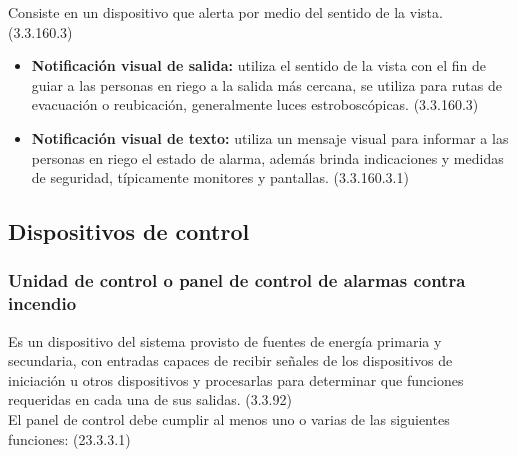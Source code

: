 Consiste en un dispositivo que alerta por medio del sentido de la vista. (3.3.160.3)


\begin{itemize}
	
	\item \textbf{Notificación visual de salida:} utiliza el sentido de la vista con el fin de guiar a las personas en riego a la salida más cercana, se utiliza para rutas de evacuación o reubicación, generalmente luces estroboscópicas. (3.3.160.3)
	
	\item \textbf{Notificación visual de texto:} utiliza un mensaje visual para informar a las personas en riego el estado de alarma, además brinda indicaciones y medidas de seguridad, típicamente monitores y pantallas. (3.3.160.3.1)
	
\end{itemize}



\subsection{Dispositivos de control}


\subsubsection{Unidad de control o panel de control de alarmas contra incendio}


Es un dispositivo del sistema provisto de fuentes de energía primaria y secundaria, con entradas capaces de recibir señales de los dispositivos de iniciación u otros dispositivos y procesarlas para determinar que funciones requeridas en cada una de sus salidas. (3.3.92)\\

El panel de control debe cumplir al menos uno o varias de las siguientes funciones: (23.3.3.1)


